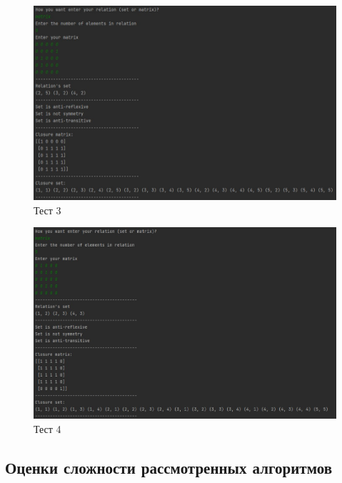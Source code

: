 \documentclass[spec, och, labwork]{shiza}
\begin{document}
        \begin{figure}[H]
            \centering      %
            \includegraphics[width=1.\textwidth]{3}
            \caption{Тест 3}
            \label{fig:image1}
        \end{figure}

        \begin{figure}[H]
            \centering      %
            \includegraphics[width=1.\textwidth]{4}
            \caption{Тест 4}
            \label{fig:image1}
        \end{figure}

        \subsection{Оценки сложности рассмотренных алгоритмов}
\end{document}
